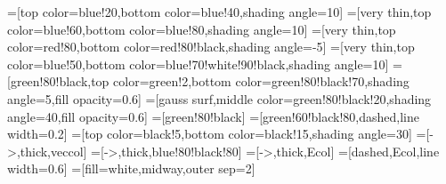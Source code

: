 \tikzset{>=latex} %

=[top color=blue!20,bottom color=blue!40,shading angle=10]
=[very thin,top color=blue!60,bottom color=blue!80,shading angle=10]
=[very thin,top color=red!80,bottom color=red!80!black,shading angle=-5]
=[very thin,top color=blue!50,bottom color=blue!70!white!90!black,shading angle=10]
=[green!80!black,top color=green!2,bottom color=green!80!black!70,shading angle=5,fill opacity=0.6]
=[gauss surf,middle color=green!80!black!20,shading angle=40,fill opacity=0.6]
=[green!80!black]
=[green!60!black!80,dashed,line width=0.2]
=[top color=black!5,bottom color=black!15,shading angle=30]
=[->,thick,veccol]
=[->,thick,blue!80!black!80]
=[->,thick,Ecol]
=[dashed,Ecol,line width=0.6]
=[fill=white,midway,outer sep=2]






  \def\H{2.0}
  \def\W{0.7}
  \def\L{3.5}
  \def\Ny{5}
  \def\Nz{4}
  \def\NEy{4}
  \def\NEz{3}
  \def\oEy{0.08*\W}
  \def\oEz{0.04*\H}
  \def\NE{6}
\def\NQ{7}
\def\E{1.1}

